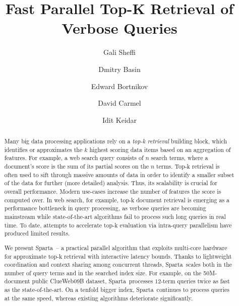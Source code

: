 \documentclass[sigplan,10pt,review,anonymous]{acmart}
\title{Fast Parallel Top-K Retrieval of Verbose Queries}
\author{Gali Sheffi}%
\author{Dmitry Basin}%
\author{Edward Bortnikov}%
\author{David Carmel}%
\author{Idit Keidar}%
\newcommand{\alg}{Sparta}
\begin{document}
\begin{abstract}



Many big data processing applications rely on a \emph{top-k retrieval} building block, which identifies or approximates the $k$ highest scoring data items based on an 
aggregation of features. For example, a web search query consists of $n$ search terms, where a document's score is the sum 
of its partial scores on the $n$ terms. Top-k  retrieval is often used to sift through massive amounts of data in order to identify a smaller subset of the data  for 
further (more detailed) analysis. Thus, its scalability is crucial for overall performance. Modern use-cases increase the number of features the score is computed over. 
In web search, for example, top-k document retrieval is emerging as a performance bottleneck in query processing, as verbose queries are becoming 
mainstream while state-of-the-art algorithms fail to process such long queries in real time. To date, attempts to
accelerate top-k evaluation via 
intra-query parallelism have produced limited results. 

We present \alg\ -- a practical parallel algorithm that exploits multi-core hardware for approximate top-k retrieval 
with interactive latency bounds. %
Thanks to lightweight coordination and context sharing among concurrent threads,
\alg\ scales both in the number of query terms and in the searched index size. 
For example, on the 50M-document public ClueWeb09B 
dataset, \alg\  processes $12$-term queries twice as fast as  the state-of-the-art. 
On a tenfold  bigger index, 
\alg\ continues to process queries at the same speed, whereas existing algorithms deteriorate significantly.
\end{abstract}


\maketitle








\clearpage

  
\end{document}
